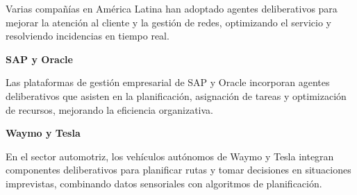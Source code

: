 \documentclass[14pt]{extarticle}
\begin{document}
  \vspace{0.3cm}
  Varias compañías en América Latina han adoptado agentes deliberativos para mejorar la atención al cliente y la gestión de redes, optimizando el servicio y resolviendo incidencias en tiempo real.

  \vspace{0.7cm}
  \textbf{SAP y Oracle}

  \vspace{0.3cm}
  Las plataformas de gestión empresarial de SAP y Oracle incorporan agentes deliberativos que asisten en la planificación, asignación de tareas y optimización de recursos, mejorando la eficiencia organizativa.

  \vspace{0.7cm}
  \textbf{Waymo y Tesla}

  \vspace{0.3cm}
  En el sector automotriz, los vehículos autónomos de Waymo y Tesla integran componentes deliberativos para planificar rutas y tomar decisiones en situaciones imprevistas, combinando datos sensoriales con algoritmos de planificación.

  \newpage

  \thispagestyle{empty}

  \nocite{*}
  \printbibliography
  
\end{document}
